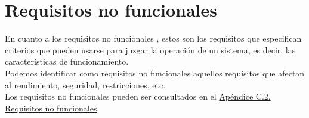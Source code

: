\section{Requisitos no funcionales}

En cuanto a los requisitos no funcionales \cite{requisitos}, estos son los requisitos que especifican criterios que pueden usarse para juzgar la operación de un sistema, es decir, las características de funcionamiento.
\\

Podemos identificar como requisitos no funcionales aquellos requisitos que afectan al rendimiento, seguridad, restricciones, etc.
\\

Los requisitos no funcionales pueden ser consultados en el \hyperref[APRequisitosNoFuncionales]{Apéndice C.2. Requisitos no funcionales}.